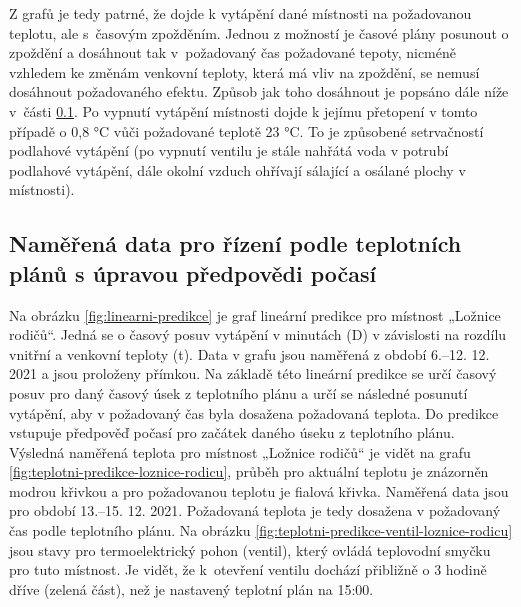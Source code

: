 Z grafů je tedy patrné, že dojde k vytápění dané místnosti na požadovanou teplotu, ale s~časovým zpožděním. Jednou z možností je časové plány posunout o zpoždění a dosáhnout tak v~požadovaný čas požadované tepoty, nicméně vzhledem ke změnám venkovní teploty, která má vliv na zpoždění, se nemusí dosáhnout požadovaného efektu. Způsob jak toho dosáhnout je popsáno dále níže v~části \ref{sec:namerena-data-pro-rizeni-podle-teplotnich-planu-s-upravou-predpovedi-pocasi}. Po vypnutí vytápění místnosti dojde k jejímu přetopení v tomto případě o 0,8 °C vůči požadované teplotě 23 °C. To je způsobené setrvačností podlahové vytápění (po vypnutí ventilu je stále nahřátá voda v potrubí podlahové vytápění, dále okolní vzduch ohřívají sálající a osálané plochy v místnosti).

\subsection{Naměřená data pro řízení podle teplotních plánů s úpravou předpovědi počasí}
\label{sec:namerena-data-pro-rizeni-podle-teplotnich-planu-s-upravou-predpovedi-pocasi}
Na obrázku \ref{fig:linearni-predikce} je graf lineární predikce pro místnost „Ložnice rodičů“. Jedná se o časový posuv vytápění v minutách (D) v závislosti na rozdílu vnitřní a venkovní teploty (t). Data v grafu jsou naměřená z období 6.–12. 12. 2021 a jsou proloženy přímkou. Na základě této lineární predikce se určí časový posuv pro daný časový úsek z teplotního plánu a určí se následné posunutí vytápění, aby v požadovaný čas byla dosažena požadovaná teplota. Do predikce vstupuje předpověď počasí pro začátek daného úseku z teplotního plánu. Výsledná naměřená teplota pro místnost „Ložnice rodičů“ je vidět na grafu \ref{fig:teplotni-predikce-loznice-rodicu}, průběh pro aktuální teplotu je znázorněn modrou křivkou a pro požadovanou teplotu je fialová křivka. Naměřená data jsou pro období 13.–15. 12. 2021. Požadovaná teplota je tedy dosažena v požadovaný čas podle teplotního plánu. Na obrázku \ref{fig:teplotni-predikce-ventil-loznice-rodicu} jsou stavy pro termoelektrický pohon (ventil), který ovládá teplovodní smyčku pro tuto místnost. Je vidět, že k~otevření ventilu dochází přibližně o 3 hodině dříve (zelená část), než je nastavený teplotní plán na 15:00.  

